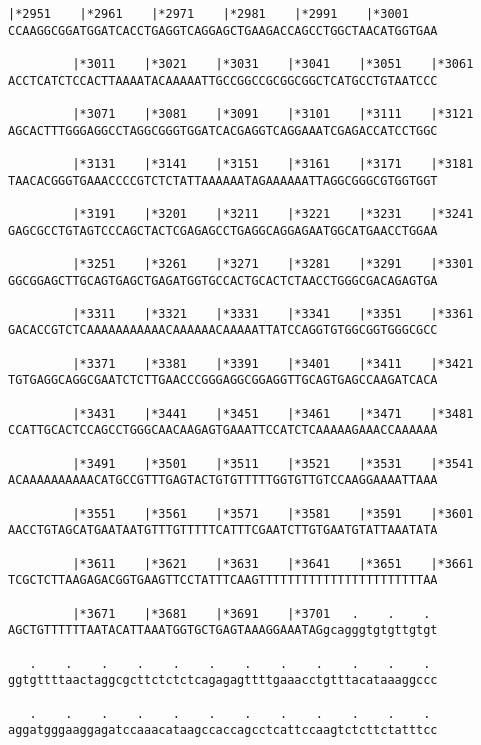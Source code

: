 \documentclass{article}
\begin{document}
\newpage
\begin{Verbatim}[fontfamily=courier]
         |*2951    |*2961    |*2971    |*2981    |*2991    |*3001
CCAAGGCGGATGGATCACCTGAGGTCAGGAGCTGAAGACCAGCCTGGCTAACATGGTGAA

         |*3011    |*3021    |*3031    |*3041    |*3051    |*3061
ACCTCATCTCCACTTAAAATACAAAAATTGCCGGCCGCGGCGGCTCATGCCTGTAATCCC

         |*3071    |*3081    |*3091    |*3101    |*3111    |*3121
AGCACTTTGGGAGGCCTAGGCGGGTGGATCACGAGGTCAGGAAATCGAGACCATCCTGGC

         |*3131    |*3141    |*3151    |*3161    |*3171    |*3181
TAACACGGGTGAAACCCCGTCTCTATTAAAAAATAGAAAAAATTAGGCGGGCGTGGTGGT

         |*3191    |*3201    |*3211    |*3221    |*3231    |*3241
GAGCGCCTGTAGTCCCAGCTACTCGAGAGCCTGAGGCAGGAGAATGGCATGAACCTGGAA

         |*3251    |*3261    |*3271    |*3281    |*3291    |*3301
GGCGGAGCTTGCAGTGAGCTGAGATGGTGCCACTGCACTCTAACCTGGGCGACAGAGTGA

         |*3311    |*3321    |*3331    |*3341    |*3351    |*3361
GACACCGTCTCAAAAAAAAAAACAAAAAACAAAAATTATCCAGGTGTGGCGGTGGGCGCC

         |*3371    |*3381    |*3391    |*3401    |*3411    |*3421
TGTGAGGCAGGCGAATCTCTTGAACCCGGGAGGCGGAGGTTGCAGTGAGCCAAGATCACA

         |*3431    |*3441    |*3451    |*3461    |*3471    |*3481
CCATTGCACTCCAGCCTGGGCAACAAGAGTGAAATTCCATCTCAAAAAGAAACCAAAAAA

         |*3491    |*3501    |*3511    |*3521    |*3531    |*3541
ACAAAAAAAAAACATGCCGTTTGAGTACTGTGTTTTTGGTGTTGTCCAAGGAAAATTAAA

         |*3551    |*3561    |*3571    |*3581    |*3591    |*3601
AACCTGTAGCATGAATAATGTTTGTTTTTCATTTCGAATCTTGTGAATGTATTAAATATA

         |*3611    |*3621    |*3631    |*3641    |*3651    |*3661
TCGCTCTTAAGAGACGGTGAAGTTCCTATTTCAAGTTTTTTTTTTTTTTTTTTTTTTTAA

         |*3671    |*3681    |*3691    |*3701   .    .    . 
AGCTGTTTTTTAATACATTAAATGGTGCTGAGTAAAGGAAATAGgcagggtgtgttgtgt

   .    .    .    .    .    .    .    .    .    .    .    . 
ggtgttttaactaggcgcttctctctcagagagttttgaaacctgtttacataaaggccc

   .    .    .    .    .    .    .    .    .    .    .    . 
aggatgggaaggagatccaaacataagccaccagcctcattccaagtctcttctatttcc

\end{Verbatim}
\end{document}
